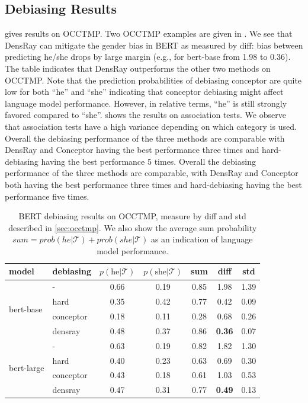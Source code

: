 
\subsection{Debiasing Results}
 gives results on OCCTMP. Two OCCTMP
examples are given in . We see that
DensRay can mitigate the gender bias in BERT as measured by
diff: bias between predicting he/she drops by large margin
(e.g., for bert-base from 1.98 to 0.36). The table indicates
that DensRay outperforms the other two methods on OCCTMP.
Note that
the prediction probabilities of debiasing conceptor are
quite low for both ``he'' and ``she'' indicating that conceptor debiasing might affect language model performance. However,
in relative terms, ``he'' is still strongly favored compared
to ``she''.
 shows the results on association tests. We observe that association tests have a high variance depending on which category is used. 
Overall the debiasing performance of the three methods are comparable with DensRay and Conceptor having the best performance three times and hard-debiasing having the best performance 5 times.
Overall the debiasing performance of the three methods are comparable, with DensRay and Conceptor both having the best performance three times and hard-debiasing having the best performance five times.

\begin{table}[ht]
\centering
\footnotesize
\vspace{0cm}  
\setlength{\abovecaptionskip}{0.2cm}   
\setlength{\belowcaptionskip}{0cm}
\begin{tabular}{llccccc}
	\toprule
	model & debiasing &$p(\text{he} | {\mathcal T})$ & $p(\text{she} | {\mathcal T})$& sum & diff & std\\
	\midrule
	\multirow{4}{2cm}{bert-base} & - & 0.66 & 0.19 & 0.85 &1.98&1.39\\
	&hard & 0.35 & 0.42 & 0.77&0.42&0.09\\
	&conceptor & 0.18 & 0.11 & 0.28 & 0.68&0.26\\
	&densray & 0.48 & 0.37 & 0.86&\textbf{0.36}&0.07\\
	\midrule
	\multirow{4}{2cm}{bert-large} & -  & 0.63 & 0.19 & 0.82  &1.82&1.30\\
	&hard & 0.40 & 0.23 & 0.63&0.69&0.30\\
	&conceptor & 0.43 & 0.18 & 0.61 & 1.03&0.53\\
	&densray  & 0.47 & 0.31 & 0.77&\textbf{0.49}&0.13 \\
	\bottomrule
\end{tabular}
\caption{ BERT debiasing results on OCCTMP, measure by diff and std described in \ref{sec:occtmp}. We also show the average sum probability $sum=prob(he|{\mathcal T})+prob(she|{\mathcal T})$ as an indication of language model performance.}
\end{table}

